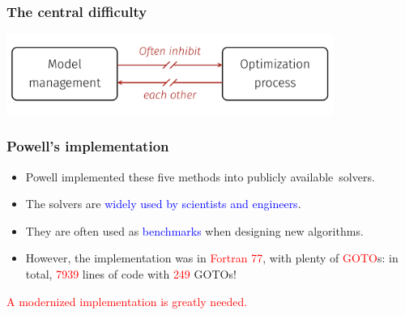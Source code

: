 \documentclass[slidestop,mathserif,xcolor=dvipsnames]{beamer}
\newcommand{\blue}[1]{\textcolor{blue}{#1}}
\newcommand{\red}[1]{\textcolor{red}{#1}}
\begin{document}
\begin{frame}
    \frametitle{The central difficulty}
    \vspace{6ex}
    \begin{center}
    \includegraphics[width=0.8\textwidth]{difficulty.png}
    \end{center}
\end{frame}


\begin{frame}
    \frametitle{Powell's implementation}

            \vspace{2ex}
    \begin{itemize}
        \item Powell implemented these five methods into publicly available~solvers.%
    \vspace{1ex}
\item The solvers are \blue{widely used by scientists and engineers}.
    \vspace{1ex}
\item They are often used as \blue{benchmarks} when designing new algorithms.
    \vspace{1ex}
        \item However, the implementation was in \red{Fortran 77}, with plenty of \red{GOTO}s:
            in total,  \red{7939} lines of code with \red{249} GOTOs!
    \end{itemize}

    \begin{center}
    \red{A modernized implementation is greatly needed.}
    \end{center}
\end{frame}
\end{document}
